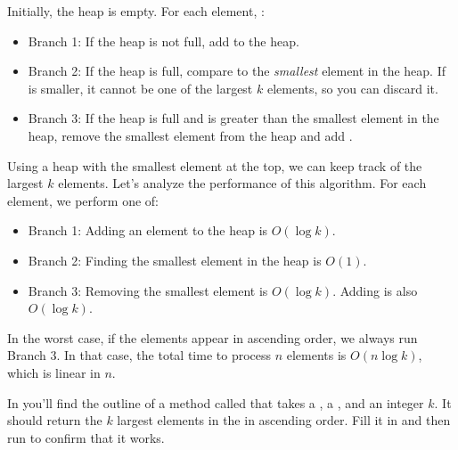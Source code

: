 \documentclass[12pt]{book}
\theoremstyle{exercise}
\begin{document}
Initially, the heap is empty.  For each element, :

\begin{itemize}

\item
  Branch 1: If the heap is not full, add  to the heap.

\item
  Branch 2: If the heap is full, compare  to the
  \emph{smallest} element in the heap. If  is smaller, it
  cannot be one of the largest $k$ elements, so you can discard
  it.

\item
  Branch 3: If the heap is full and  is greater than the
  smallest element in the heap, remove the smallest element from the
  heap and add .

\end{itemize}


Using a heap with the smallest element at the top, we can keep track of
the largest $k$ elements. Let's analyze the performance of this
algorithm. For each element, we perform one of:

\begin{itemize}

\item
  Branch 1: Adding an element to the heap is $O(\log k)$.

\item
  Branch 2: Finding the smallest element in the heap is $O(1)$.

\item
  Branch 3: Removing the smallest element is $O(\log k)$. Adding
   is also $O(\log k)$.

\end{itemize}

In the worst case, if the elements appear in ascending order, we always
run Branch 3. In that case, the total time to process $n$
elements is $O(n \log k)$, which is linear in $n$.


In  you'll find the outline of a method called
 that takes a , a , and an
integer $k$. It should return the $k$ largest elements in the
 in ascending order. Fill it in and then run  to confirm that it works.

\end{document}

